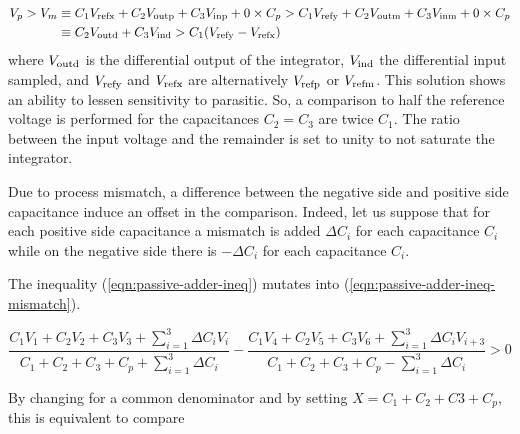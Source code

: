 \begin{align}
	\label{eqn:passive-adder-ineq}
	V_p > V_m &\equiv C_1V_{\rm refx}+C_2V_{\rm outp}+C_3V_{\rm inp}+0\times C_p > C_1V_{\rm refy}+C_2V_{\rm outm}+C_3V_{\rm inm}+0\times C_p \\
	&\equiv C_2V_{\rm outd}+C_3V_{\rm ind} > C_1(V_{\rm refy}-V_{\rm refx})
\end{align}
where  \(V_{\rm outd}\) is the differential output of the integrator, \(V_{\rm ind}\) the differential input sampled, and \(V_{\rm refy}\) and \(V_{\rm refx}\) are alternatively \(V_{\rm refp}\) or \(V_{\rm refm}\). This solution shows an ability to lessen sensitivity to parasitic. So, a comparison to half the reference voltage is performed for the capacitances \(C_2 = C_3\) are twice \(C_1\). The ratio between the input voltage and the remainder is set to unity to not saturate the integrator.

Due to process mismatch, a difference between the negative side and positive side capacitance induce an offset in the comparison. Indeed, let us suppose that for each positive side capacitance a mismatch is added \(\Delta C_i\) for each capacitance \(C_i\) while on the negative side there is \(-\Delta C_i\) for each capacitance \(C_i\).

The inequality (\ref{eqn:passive-adder-ineq}) mutates into (\ref{eqn:passive-adder-ineq-mismatch}).

\begin{equation}
	\label{eqn:passive-adder-ineq-mismatch}
	\frac{C_1V_{1}+C_2V_{2}+C_3V_{3}+\sum_{i=1}^{3}{\Delta C_i V_i}}{C_1+C_2+C_3+C_p+\sum_{i=1}^{3}{\Delta C_i}} - \frac{C_1V_{4}+C_2V_{5}+C_3V_{6}+\sum_{i=1}^{3}{\Delta C_i V_{i+3}}}{C_1+C_2+C_3+C_p-\sum_{i=1}^{3}{\Delta C_i}} > 0
\end{equation}

By changing for a common denominator and by setting \(X = C_1 + C_2 + C3 + C_p\), this is equivalent to compare

